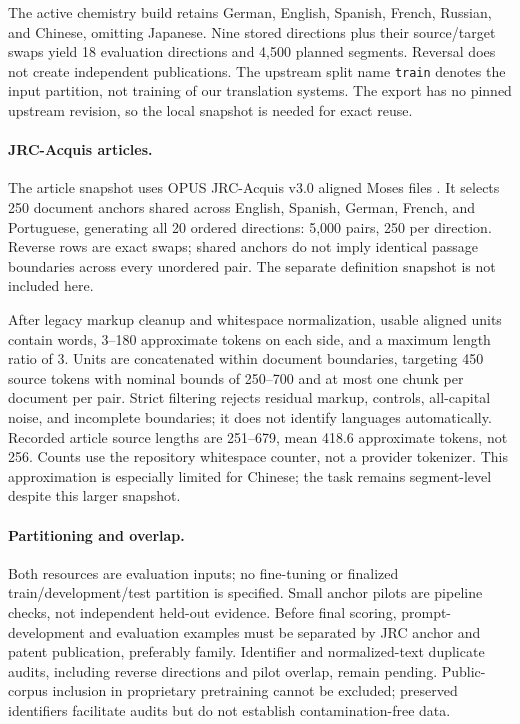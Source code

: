 \documentclass[11pt]{article}
\begin{document}
The active chemistry build retains German, English, Spanish, French, Russian, and Chinese,
omitting Japanese. Nine stored directions plus their source/target swaps yield 18 evaluation
directions and 4,500 planned segments. Reversal does not create independent publications.
The upstream split name \texttt{train} denotes the input partition, not training of our translation
systems. The export has no pinned upstream revision, so the local snapshot is needed for exact reuse.

\paragraph{JRC-Acquis articles.}
The article snapshot uses OPUS JRC-Acquis v3.0 aligned Moses files
\cite{steinberger2006,tiedemann2012}. It selects 250 document anchors shared across English,
Spanish, German, French, and Portuguese, generating all 20 ordered directions: 5,000 pairs,
250 per direction. Reverse rows are exact swaps; shared anchors do not imply identical passage
boundaries across every unordered pair. The separate definition snapshot is not included here.

After legacy markup cleanup and whitespace normalization, usable aligned units contain words,
3--180 approximate tokens on each side, and a maximum length ratio of 3. Units are concatenated
within document boundaries, targeting 450 source tokens with nominal bounds of 250--700 and at most
one chunk per document per pair. Strict filtering rejects residual markup, controls, all-capital
noise, and incomplete boundaries; it does not identify languages automatically. Recorded article
source lengths are 251--679, mean 418.6 approximate tokens, not 256. Counts use the repository
whitespace counter, not a provider tokenizer. This approximation is especially limited for Chinese;
the task remains segment-level despite this larger snapshot.

\paragraph{Partitioning and overlap.}
Both resources are evaluation inputs; no fine-tuning or finalized train/development/test partition
is specified. Small anchor pilots are pipeline checks, not independent held-out evidence. Before
final scoring, prompt-development and evaluation examples must be separated by JRC anchor and patent
publication, preferably family. Identifier and normalized-text duplicate audits, including reverse
directions and pilot overlap, remain pending. Public-corpus inclusion in proprietary pretraining
cannot be excluded; preserved identifiers facilitate audits but do not establish contamination-free data.
\end{document}

